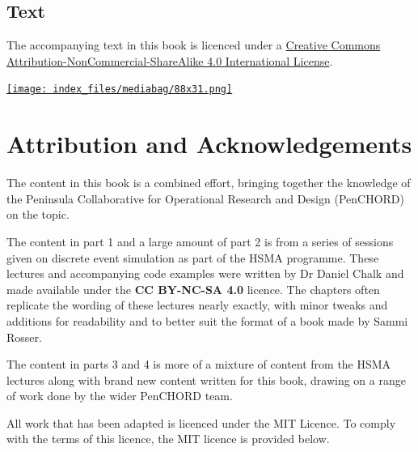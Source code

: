 \documentclass[
  letterpaper,
  DIV=11,
  numbers=noendperiod]{scrreprt}
\begin{document}
\subsection*{Text}\label{text}

The accompanying text in this book is licenced under a
\href{http://creativecommons.org/licenses/by-nc-sa/4.0/}{Creative
Commons Attribution-NonCommercial-ShareAlike 4.0 International License}.

\href{http://creativecommons.org/licenses/by-nc-sa/4.0/}{}

\href{http://creativecommons.org/licenses/by-nc-sa/4.0/}{\texttt{[image: index\_files/mediabag/88x31.png]}}

\section*{Attribution and
Acknowledgements}\label{attribution-and-acknowledgements}


The content in this book is a combined effort, bringing together the
knowledge of the Peninsula Collaborative for Operational Research and
Design (PenCHORD) on the topic.

The content in part 1 and a large amount of part 2 is from a series of
sessions given on discrete event simulation as part of the HSMA
programme. These lectures and accompanying code examples were written by
Dr Daniel Chalk and made available under the \textbf{CC BY-NC-SA 4.0}
licence. The chapters often replicate the wording of these lectures
nearly exactly, with minor tweaks and additions for readability and to
better suit the format of a book made by Sammi Rosser.

The content in parts 3 and 4 is more of a mixture of content from the
HSMA lectures along with brand new content written for this book,
drawing on a range of work done by the wider PenCHORD team.

All work that has been adapted is licenced under the MIT Licence. To
comply with the terms of this licence, the MIT licence is provided
below.
\end{document}

